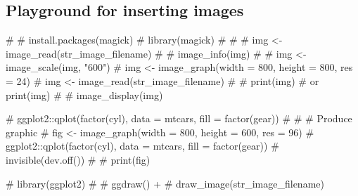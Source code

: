 \documentclass[
]{article}
\newenvironment{Shaded}{\begin{snugshade}}{\end{snugshade}}
\newcommand{\CommentTok}[1]{\textcolor[rgb]{0.54,0.53,0.53}{#1}}
\begin{document}
\hypertarget{playground-for-inserting-images}{%
\subsection{Playground for inserting
images}\label{playground-for-inserting-images}}

\begin{Shaded}
\begin{Highlighting}[]
\CommentTok{\# \# install.packages(\textquotesingle{}magick\textquotesingle{})}
\CommentTok{\# library(magick)}
\CommentTok{\# }
\CommentTok{\# \# img \textless{}{-} image\_read(str\_image\_filename)}
\CommentTok{\# \# image\_info(img)}
\CommentTok{\# \# img \textless{}{-} image\_scale(img, "600")}
\CommentTok{\# img \textless{}{-} image\_graph(width = 800, height = 800, res = 24)}
\CommentTok{\# img \textless{}{-} image\_read(str\_image\_filename)}
\CommentTok{\# }
\CommentTok{\# print(img) \# or print(img)}
\CommentTok{\# \# image\_display(img)}
\end{Highlighting}
\end{Shaded}

\begin{Shaded}
\begin{Highlighting}[]
\CommentTok{\# ggplot2::qplot(factor(cyl), data = mtcars, fill = factor(gear))}
\CommentTok{\# }
\CommentTok{\# \# Produce graphic}
\CommentTok{\# fig \textless{}{-} image\_graph(width = 800, height = 600, res = 96)}
\CommentTok{\# ggplot2::qplot(factor(cyl), data = mtcars, fill = factor(gear))}
\CommentTok{\# invisible(dev.off())}
\CommentTok{\# }
\CommentTok{\# print(fig)}
\end{Highlighting}
\end{Shaded}

\begin{Shaded}
\begin{Highlighting}[]
\CommentTok{\# library(ggplot2)}
\CommentTok{\# }
\CommentTok{\# ggdraw() +}
\CommentTok{\#   draw\_image(str\_image\_filename)}
\end{Highlighting}
\end{Shaded}
\end{document}
